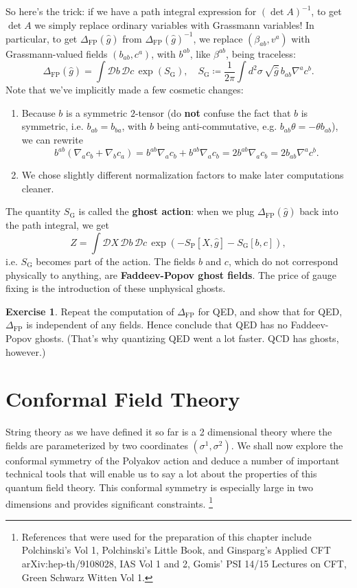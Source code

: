 \documentclass{report}
\theoremstyle{plain}
\theoremstyle{definition}
\newtheorem{exercise}{Exercise}[section]
\theoremstyle{remark}
\newcommand{\sg}{\sigma}
\newcommand{\cD}{\mathcal{D}}
\newcommand{\detFP}{\Delta_{\text{FP}}}
\begin{document}
So here's the trick: if we have a path integral expression for $(\det
A)^{-1}$, to get $\det A$ we simply replace ordinary variables with
Grassmann variables! In particular, to get $\detFP(\hat{g})$ from
$\detFP(\hat{g})^{-1}$, we replace $(\beta_{ab}, v^a)$ with
Grassmann-valued fields $(b_{ab}, c^a)$, with $b^{ab}$, like
$\beta^{ab}$, being traceless:
\[ \detFP(\hat{g}) = \int \cD b \, \cD c \, \exp(S_{\text{G}}), \quad S_{\text{G}} \coloneqq \frac{1}{2\pi} \int d^2\sigma \, \sqrt{\hat{g}} \, b_{ab} \nabla^a c^b. \]
Note that we've implicitly made a few cosmetic changes:
\begin{enumerate}
\item Because $b$ is a symmetric $2$-tensor (do {\bf not} confuse the
  fact that $b$ is symmetric, i.e. $b_{ab} = b_{ba}$, with $b$ being
  anti-commutative, e.g. $b_{ab}\theta = -\theta b_{ab}$), we can
  rewrite
  \[ b^{ab}(\nabla_a c_b + \nabla_b c_a) = b^{ab}\nabla_a c_b + b^{ab} \nabla_a c_b = 2b^{ab}\nabla_a c_b = 2b_{ab} \nabla^a c^b. \]
\item We chose slightly different normalization factors to make later
  computations cleaner.
\end{enumerate}
The quantity $S_{\text{G}}$ is called the {\bf ghost action}: when we
plug $\detFP(\hat{g})$ back into the path integral, we get
\[ Z = \int \cD X \, \cD b \, \cD c \, \exp(-S_{\text{P}}[X, \hat{g}] - S_{\text{G}}[b, c]), \]
i.e. $S_{\text{G}}$ becomes part of the action. The fields $b$ and
$c$, which do not correspond physically to anything, are {\bf
  Faddeev-Popov ghost fields}. The price of gauge fixing is the
introduction of these unphysical ghosts.

\begin{exercise}
  Repeat the computation of $\detFP$ for QED, and show that for QED,
  $\detFP$ is independent of any fields. Hence conclude that QED has
  no Faddeev-Popov ghosts. (That's why quantizing QED went a lot
  faster. QCD has ghosts, however.)
\end{exercise}

\chapter{Conformal Field Theory}
String theory as we have defined it so far is a 2 dimensional theory where
the fields are parameterized by two coordinates $(\sg^1,\sg^2)$. We shall
now explore the conformal symmetry of the Polyakov action and deduce a
number of important technical tools that will enable us to say a lot about
the properties of this quantum field theory. This conformal symmetry is
especially large in two dimensions and provides significant constraints.
\footnote{References that were used for the preparation of this chapter
include Polchinski's Vol 1, Polchinski's Little Book, and Ginsparg's
Applied CFT arXiv:hep-th/9108028, IAS Vol 1 and 2, Gomis' PSI 14/15
Lectures on CFT, Green Schwarz Witten Vol 1.}
\end{document}

